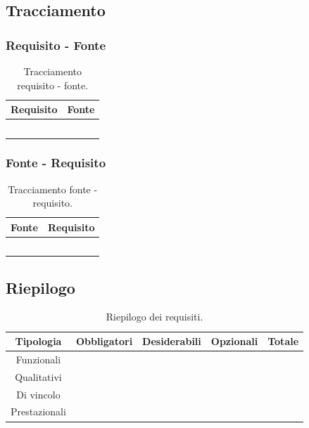 \documentclass[8pt]{article}
\begin{document}
\subsection{Tracciamento}
\subsubsection{Requisito - Fonte}
\begin{longtable}{cc}
		\toprule
		\textbf{Requisito} & \textbf{Fonte} \\
		\midrule
             &  \\
             &  \\
             &  \\
             &  \\
		\bottomrule
	\caption{Tracciamento requisito - fonte.}
	\label{table:Tracciamento requisito - fonte}
\end{longtable}

\subsubsection{Fonte - Requisito}
\begin{longtable}{cc}
		\toprule
		\textbf{Fonte} & \textbf{Requisito} \\
		\midrule
             &  \\
             &  \\
             &  \\
             &  \\
		\bottomrule
	\caption{Tracciamento fonte - requisito.}
	\label{table:Tracciamento requisito - fonte}
\end{longtable}

\subsection{Riepilogo}
\begin{table}[ht!]
\hypersetup{hidelinks}
    \centering
    \renewcommand{\arraystretch}{1.25}
	\begin{tabular}{ccccc}
		\toprule
		\textbf{Tipologia} & \textbf{Obbligatori} & \textbf{Desiderabili} & \textbf{Opzionali} & \textbf{Totale}\\
		\midrule
            Funzionali &  &  &  & \\
            Qualitativi &  &  &  & \\
            Di vincolo &  &  &  & \\
            Prestazionali &  &  &  & \\
		\bottomrule
	\end{tabular}
	\caption{Riepilogo dei requisiti.}
	\label{table:Riepilogo dei requisiti}
\end{table}
\end{document}
